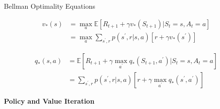 \documentclass{article}
\begin{document}
\noindent
Bellman Optimality Equations

\begin{equation}
\begin{aligned}
v_{*}(s) & = \max _{a} \mathbb{E}\left[R_{t+1}+\gamma v_{*}\left(S_{t+1}\right) | S_{t}=s, A_{t}=a\right]\\
&= \max _{a} \sum_{s^{\prime}, r} p\left(s^{\prime}, r | s, a\right)\left[r+\gamma v_{*}\left(s^{\prime}\right)\right]
\end{aligned}
\end{equation}

\begin{equation}
\begin{aligned}
q_{*}(s, a)&=\mathbb{E}\left[R_{t+1}+\gamma \max _{a^{\prime}} q_{*}\left(S_{t+1}, a^{\prime}\right) | S_{t}=s, A_{t}=a\right] \\
&=\sum_{s^{\prime}, r} p\left(s^{\prime}, r | s, a\right)\left[r+\gamma \max _{a^{\prime}} q_{*}\left(s^{\prime}, a^{\prime}\right)\right]
\end{aligned}
\end{equation}

\noindent
\textbf{Policy and Value Iteration}
\end{document}
